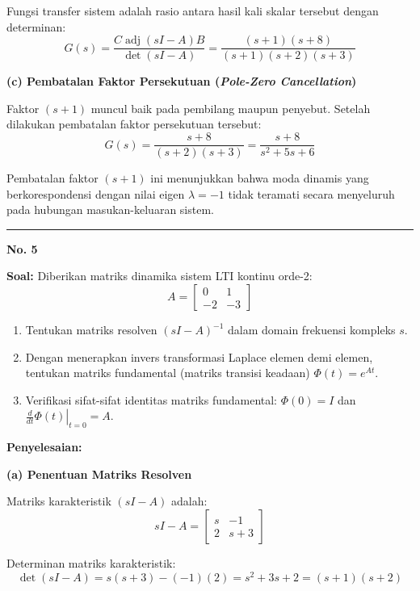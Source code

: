 \documentclass[11pt,a4paper]{article}
\begin{document}
Fungsi transfer sistem adalah rasio antara hasil kali skalar tersebut dengan determinan:
$$G(s) = \frac{C \operatorname{adj}(sI - A) B}{\det(sI - A)} = \frac{(s+1)(s+8)}{(s+1)(s+2)(s+3)}$$

\textbf{(c) Pembatalan Faktor Persekutuan (\textit{Pole-Zero Cancellation})}

Faktor $(s+1)$ muncul baik pada pembilang maupun penyebut. Setelah dilakukan pembatalan faktor persekutuan tersebut:
$$G(s) = \frac{s + 8}{(s+2)(s+3)} = \frac{s + 8}{s^2 + 5s + 6}$$

Pembatalan faktor $(s+1)$ ini menunjukkan bahwa moda dinamis yang berkorespondensi dengan nilai eigen $\lambda = -1$ tidak teramati secara menyeluruh pada hubungan masukan-keluaran sistem.

\vspace{12pt}
\hrule
\vspace{10pt}

\textbf{\large No. 5}

\textbf{Soal:}  
Diberikan matriks dinamika sistem LTI kontinu orde-2:
$$A = \begin{bmatrix} 0 & 1 \\ -2 & -3 \end{bmatrix}$$
\begin{enumerate}[label=(\alph*)]
    \item Tentukan matriks resolven $(sI - A)^{-1}$ dalam domain frekuensi kompleks $s$.
    \item Dengan menerapkan invers transformasi Laplace elemen demi elemen, tentukan matriks fundamental (matriks transisi keadaan) $\Phi(t) = e^{At}$.
    \item Verifikasi sifat-sifat identitas matriks fundamental: $\Phi(0) = I$ dan $\left.\frac{d}{dt}\Phi(t)\right|_{t=0} = A$.
\end{enumerate}

\textbf{Penyelesaian:}

\textbf{(a) Penentuan Matriks Resolven}

Matriks karakteristik $(sI - A)$ adalah:
$$sI - A = \begin{bmatrix} s & -1 \\ 2 & s+3 \end{bmatrix}$$

Determinan matriks karakteristik:
$$\det(sI - A) = s(s+3) - (-1)(2) = s^2 + 3s + 2 = (s+1)(s+2)$$
\end{document}
